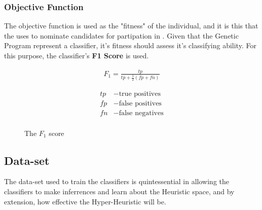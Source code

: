 \documentclass[a4paper,12pt]{article}
\begin{document}
        \subsubsection*{Objective Function} \label{subsubsec:objectivefunction}
            \par{
                \noindent The objective function is used as the "fitness" of the individual, and it is this that the  uses to nominate candidates 
                for partipation in . \newline 
                \newline 
                Given that the Genetic Program represent a classifier, it's fitness should assess it's classifying ability. For this purpose, the classifier's \textbf{F1 Score} \cite{f1score} is used.
                \begin{figure}[h!]
                    \begin{minipage}[c]{0.5\textwidth}
                        \begin{align*} 
                            \nonumber F_{1} =  \frac{tp}{tp + \frac{1}{2}(fp + fn)}
                        \end{align*}
                    \end{minipage}
                    \begin{minipage}[c]{0.5\textwidth}
                        \begin{align*} 
                            \nonumber tp &- \text{true positives} \\
                            \nonumber fp &- \text{false positives} \\
                            \nonumber fn &- \text{false negatives} \\
                        \end{align*}
                    \end{minipage}
                    \caption{The $F_1$ score}
                \end{figure} 
            }
    \subsection{Data-set}
        \par{
            \noindent The data-set used to train the classifiers is quintessential in allowing the classifiers to make inferrences and learn about the 
            Heuristic space, and by extension, how effective the Hyper-Heuristic will be.  
        }
\end{document}
